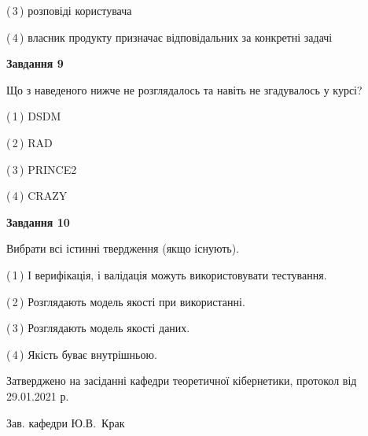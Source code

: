 \documentclass[10pt, ukrainian]{article}
\begin{document}
{\begin {large}
(\,3\,) розповіді користувача%



(\,4\,) власник продукту призначає відповідальних за конкретні задачі%


{\begin {center}\textbf{Завдання 9}\end {center}}\par
Що з наведеного нижче не розглядалось та навіть не згадувалось у курсі?\par
\vspace{2mm}



(\,1\,) DSDM%



(\,2\,) RAD%



(\,3\,) PRINCE2%



(\,4\,) CRAZY%


{\begin {center}\textbf{Завдання 10}\end {center}}\par
Вибрати всі істинні твердження (якщо існують).\par
\vspace{2mm}



(\,1\,) І верифікація, і валідація можуть використовувати тестування.%



(\,2\,) Розглядають модель якості при використанні.%



(\,3\,) Розглядають модель якості даних.%



(\,4\,) Якість буває внутрішньою.%



\end {large}}
{\vspace{5mm}\smallskip \begin {small} Затверджено на засіданні кафедри теоретичної кібернетики, протокол  від   29.01.2021 р.\par\smallskip\smallskip
{\parbox {6.5 cm}{Зав. кафедри \dotfill Ю.В.~Крак}} \end{small}}
\newpage
\end{document}
